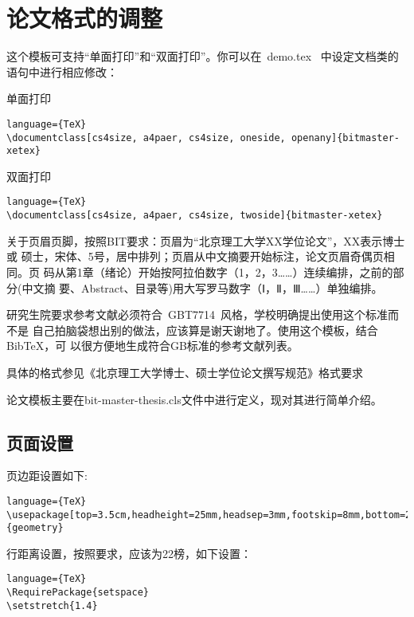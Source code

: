 

\chapter{论文格式的调整}
\label{sec:thesisformat}



这个模板可支持``单面打印''和``双面打印''。你可以在~demo.tex~
中设定文档类的语句中进行相应修改：

单面打印
\begin{lstlisting}language={TeX}
\documentclass[cs4size, a4paer, cs4size, oneside, openany]{bitmaster-xetex}
\end{lstlisting}

双面打印
\begin{lstlisting}language={TeX}
\documentclass[cs4size, a4paer, cs4size, twoside]{bitmaster-xetex}
\end{lstlisting}

关于页眉页脚，按照BIT要求：页眉为``北京理工大学XX学位论文''，XX表示博士或
硕士，宋体、5号，居中排列；页眉从中文摘要开始标注，论文页眉奇偶页相同。页
码从第1章（绪论）开始按阿拉伯数字（1，2，3……）连续编排，之前的部分(中文摘
要、Abstract、目录等)用大写罗马数字（Ⅰ，Ⅱ，Ⅲ……）单独编排。

研究生院要求参考文献必须符合~GBT7714~风格，学校明确提出使用这个标准而不是
自己拍脑袋想出别的做法，应该算是谢天谢地了。使用这个模板，结合BibTeX，可
以很方便地生成符合GB标准的参考文献列表。

具体的格式参见《北京理工大学博士、硕士学位论文撰写规范》格式要求

论文模板主要在bit-master-thesis.cls文件中进行定义，现对其进行简单介绍。
\section{页面设置}
页边距设置如下:
\begin{lstlisting}language={TeX}
\usepackage[top=3.5cm,headheight=25mm,headsep=3mm,footskip=8mm,bottom=2.5cm,left=2.7cm,right=2.7cm]{geometry}
\end{lstlisting}

行距离设置，按照要求，应该为22榜，如下设置：
\begin{lstlisting}language={TeX}
\RequirePackage{setspace}
\setstretch{1.4}
\end{lstlisting}

